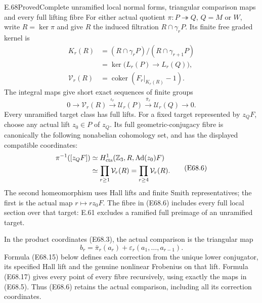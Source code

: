 \begin{statement}{E.68}{Proved}{Complete unramified local normal forms, triangular comparison maps and every full lifting fibre}
For either actual quotient $\pi:P\twoheadrightarrow Q$,
$Q=M$ or $W$, write $R=\ker\pi$ and give $R$ the induced
filtration $R\cap\gamma_rP$. Its finite free graded kernel is
\[
 \begin{split}
 K_r(R)&=(R\cap\gamma_rP)/(R\cap\gamma_{r+1}P)\\
       &=\ker\bigl(L_r(P)\longrightarrow L_r(Q)\bigr),\\
 \mathcal V_r(R)&=\operatorname{coker}(F_r|_{K_r(R)}-1).
 \end{split}
 \tag{E68.4}
\]
The integral maps give short exact sequences of finite groups
\[
 0\longrightarrow\mathcal V_r(R)
      \xrightarrow{\ \iota_r\ }\mathcal U_r(P)
      \xrightarrow{\ \bar\pi_r\ }\mathcal U_r(Q)
      \longrightarrow0 .
 \tag{E68.5}
\]
Every unramified target class has full lifts. For a fixed
target represented by $z_QF$, choose any actual lift
$z_0\in P$ of $z_Q$. Its full geometric-conjugacy fibre is
canonically the following nonabelian cohomology set, and
has the displayed compatible coordinates:
\[
 \begin{split}
 \pi^{-1}([z_QF])
 &\simeq H^1_{\rm cts}\!
       \left(\mathbb Z_3,R,\operatorname{Ad}(z_0)F\right)\\
 &\simeq\prod_{r\ge1}\mathcal V_r(R)
       =\prod_{r\ge4}\mathcal V_r(R).
 \end{split}
 \tag{E68.6}
\]
The second homeomorphism uses Hall lifts and finite Smith
representatives; the first is the actual map $r\mapsto rz_0F$.
The fibre in (E68.6) includes every full local section over
that target: E.61 excludes a ramified full preimage of an
unramified target.

In the product coordinates (E68.3), the actual comparison
is the triangular map
\[
 b_r=\bar\pi_r(a_r)+
                  \varepsilon_r(a_1,\ldots,a_{r-1}).
 \tag{E68.7}
\]
Formula (E68.15) below defines each correction from the
unique lower conjugator, its specified Hall lift and the
genuine nonlinear Frobenius on that lift. Formula (E68.17)
gives every point of every fibre recursively, using exactly
the maps in (E68.5). Thus (E68.6) retains the actual
comparison, including all its correction coordinates.


\end{statement}
